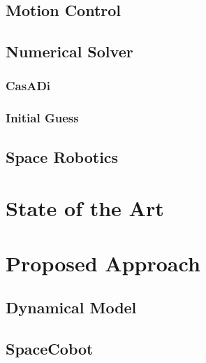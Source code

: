 \documentclass[a4paper, oneside]{article}
\begin{document}
    \subsection{Motion Control}
    \label{sec:Background:Motion Control}
    

    \subsection{Numerical Solver}
    \subsubsection{CasADi}
    \label{sec:Background:Numerical Solver:Casadi}
    

    \subsubsection{Initial Guess}
    \label{sec:Background:Numerical Solver:Initial guess}
    

    \subsection{Space Robotics}
    \label{sec:Background:Space Robots}
    


\clearpage
\section{State of the Art}
    \label{sec:State of the Art:Payload Transportation}
    

\clearpage
\section{Proposed Approach}

    \subsection{Dynamical Model}
    \label{sec:Proposed Approach:Motion Model}
    

    \subsection{SpaceCobot}
    \label{sec:Proposed Approach: Space Cobot}
    
\end{document}

